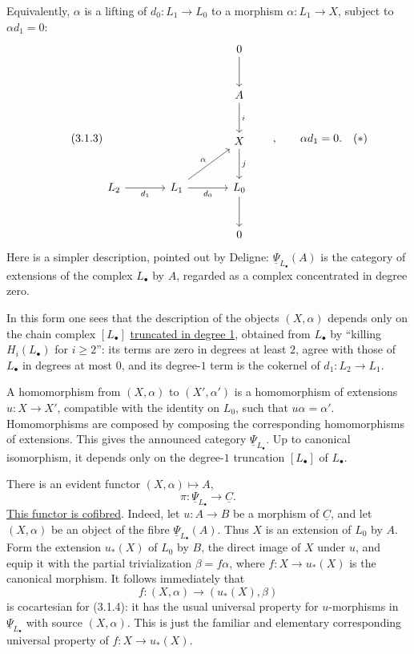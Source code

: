 Equivalently, $\alpha$ is a lifting of $d_0:L_1\longrightarrow L_0$
to a morphism $\alpha:L_1\longrightarrow X$, subject to
$\alpha d_1=0$:
\begin{equation}\tag{3.1.3}
\begin{tikzcd}[row sep=large,column sep=large]
 &&0\arrow[d]\\
 &&A\arrow[d,"i"]\\
 &&X\arrow[d,"j"]\\
 L_2\arrow[r,"d_1"']&L_1\arrow[r,"d_0"']\arrow[ru,"\alpha"]
   &L_0\arrow[d]\\
 &&0
\end{tikzcd}
\qquad,\qquad \alpha d_1=0.\quad(*)
\end{equation}
Here is a simpler description, pointed out by Deligne:
$\underline\Psi_{L_\bullet}(A)$ is the category of extensions of the
complex $L_\bullet$ by $A$, regarded as a complex concentrated in
degree zero.

In this form one sees that the description of the objects
$(X,\alpha)$ depends only on the chain complex $[L_\bullet]$
\underline{truncated in degree 1}, obtained from $L_\bullet$ by
``killing $H_i(L_\bullet)$ for $i\geq2$'': its terms are zero in
degrees at least $2$, agree with those of $L_\bullet$ in degrees at
most $0$, and its degree-$1$ term is the cokernel of
$d_1:L_2\longrightarrow L_1$.

A homomorphism from $(X,\alpha)$ to $(X',\alpha')$ is a homomorphism
of extensions $u:X\longrightarrow X'$, compatible with the identity
on $L_0$, such that $u\alpha=\alpha'$. Homomorphisms are composed by
composing the corresponding homomorphisms of extensions. This gives
the announced category $\underline\Psi_{L_\bullet}$. Up to canonical
isomorphism, it depends only on the degree-$1$ truncation
$[L_\bullet]$ of $L_\bullet$.

There is an evident functor $(X,\alpha)\longmapsto A$,
\begin{equation}\tag{3.1.4}
 \pi:\underline\Psi_{L_\bullet}\longrightarrow\underline C.
\end{equation}
\underline{This functor is cofibred}. Indeed, let
$u:A\longrightarrow B$ be a morphism of $\underline C$, and let
$(X,\alpha)$ be an object of the fibre
$\underline\Psi_{L_\bullet}(A)$. Thus $X$ is an extension of $L_0$ by
$A$. Form the extension $u_*(X)$ of $L_0$ by $B$, the direct image of
$X$ under $u$, and equip it with the partial trivialization
$\beta=f\alpha$, where $f:X\longrightarrow u_*(X)$ is the canonical
morphism. It follows immediately that
\[
 f:(X,\alpha)\longrightarrow(u_*(X),\beta)
\]
is cocartesian for (3.1.4): it has the usual universal property for
$u$-morphisms in $\underline\Psi_{L_\bullet}$ with source
$(X,\alpha)$. This is just the familiar and elementary corresponding
universal property of $f:X\longrightarrow u_*(X)$.

